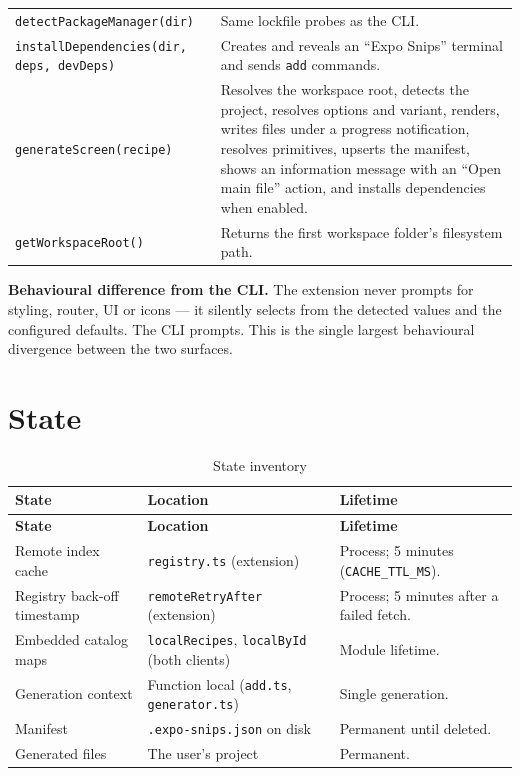 \begin{longtable}{@{}L{4.2cm}L{9.8cm}@{}}
\texttt{detectPackageManager(dir)} & Same lockfile probes as the CLI. \\
\texttt{installDependencies(dir, deps, devDeps)} & Creates and reveals an ``Expo
Snips'' terminal and sends \texttt{add} commands. \\
\texttt{generateScreen(recipe)} & Resolves the workspace root, detects the project,
resolves options and variant, renders, writes files under a progress notification,
resolves primitives, upserts the manifest, shows an information message with an
``Open main file'' action, and installs dependencies when enabled. \\
\texttt{getWorkspaceRoot()} & Returns the first workspace folder's filesystem path. \\
\bottomrule
\end{longtable}

\textbf{Behavioural difference from the CLI.} The extension never prompts for
styling, router, UI or icons --- it silently selects from the detected values and
the configured defaults. The CLI prompts. This is the single largest behavioural
divergence between the two surfaces.

\section{State}

\begin{longtable}{@{}L{3.4cm}L{4.4cm}L{6.2cm}@{}}
\caption{State inventory}\\
\toprule
\textbf{State} & \textbf{Location} & \textbf{Lifetime} \\
\midrule
\endfirsthead
\toprule
\textbf{State} & \textbf{Location} & \textbf{Lifetime} \\
\midrule
\endhead
Remote index cache & \texttt{registry.ts} (extension) & Process; 5 minutes
(\texttt{CACHE\_TTL\_MS}). \\
Registry back-off timestamp & \texttt{remoteRetryAfter} (extension) & Process; 5
minutes after a failed fetch. \\
Embedded catalog maps & \texttt{localRecipes}, \texttt{localById} (both clients) &
Module lifetime. \\
Generation context & Function local (\texttt{add.ts}, \texttt{generator.ts}) & Single
generation. \\
Manifest & \texttt{.expo-snips.json} on disk & Permanent until deleted. \\
Generated files & The user's project & Permanent. \\
\bottomrule
\end{longtable}

